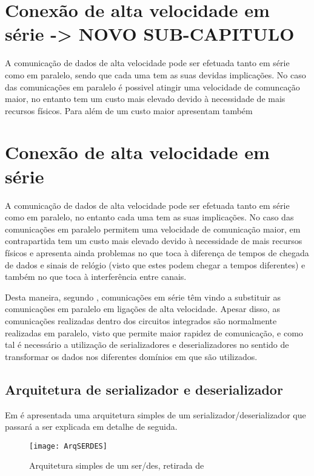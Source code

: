 \section{Conexão de alta velocidade em série -> NOVO SUB-CAPITULO} \label{sec:conexaoSerie_new}

A comunicação de dados de alta velocidade pode ser efetuada tanto em série como em paralelo, sendo que cada uma tem as suas devidas implicações. No caso das comunicações em paralelo é possivel atingir uma velocidade de comuncação maior, no entanto tem um custo mais elevado devido à necessidade de mais recursos físicos. Para além de um custo maior apresentam também 



\section{Conexão de alta velocidade em série} \label{sec:conexaoSerie}
A comunicação de dados de alta velocidade pode ser efetuada tanto em série como em paralelo, no entanto cada uma tem as suas implicações. No caso das comunicações em paralelo permitem uma velocidade de comunicação maior, em contrapartida tem um custo mais elevado devido à necessidade de mais recursos físicos e apresenta ainda problemas no que toca à diferença de tempos de chegada de dados e sinais de relógio (visto que estes podem chegar a tempos diferentes) e também no que toca à interferência entre canais. 

Desta maneira, segundo \cite{R012}, comunicações em série têm vindo a substituir as comunicações em paralelo em ligações de alta velocidade. Apesar disso, as comunicações realizadas dentro dos circuitos integrados são normalmente realizadas em paralelo, visto que permite maior rapidez de comunicação, e como tal é necessário a utilização de serializadores e deserializadores no sentido de transformar os dados nos diferentes domínios em que são utilizados.

\subsection{Arquitetura de serializador e deserializador}

Em \cite{R012} é apresentada uma arquitetura simples de um serializador/deserializador que passará a ser explicada em detalhe de seguida.

\begin{figure}[h!]
	\begin{center}
		\leavevmode
		\texttt{[image: ArqSERDES]}
		\caption{Arquitetura simples de um ser/des, retirada de \cite{R012}}
		\label{fig:arquiteturaSERDES}
	\end{center}
\end{figure}

